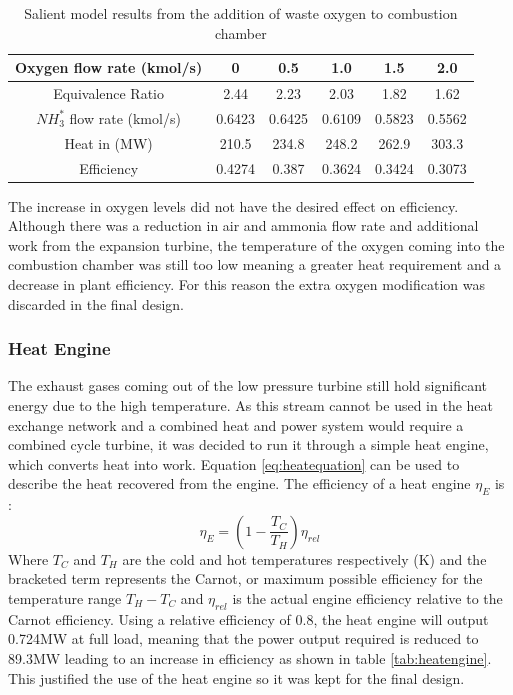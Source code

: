 \begin {table} [h]
\begin{center}
\caption{Salient model results from the addition of waste oxygen to combustion chamber} \label{tab:extraox} 
\begin{tabular}{ |c|c|c|c|c|c| }
 \hline
  Oxygen flow rate (kmol/s) & 0 & 0.5 & 1.0 & 1.5 & 2.0\\ 
   \hline
  Equivalence Ratio & 2.44 & 2.23 & 2.03 & 1.82 & 1.62\\
    \hline
  $NH_3^*$ flow rate (kmol/s) & 0.6423 & 0.6425 & 0.6109 & 0.5823 & 0.5562\\ 
    \hline
  Heat in (MW) & 210.5 & 234.8 & 248.2 & 262.9 & 303.3 \\
  \hline
  Efficiency & 0.4274 & 0.387 & 0.3624 & 0.3424 & 0.3073\\ 
 \hline
\end{tabular}
\end{center}  
\end {table} 
The increase in oxygen levels did not have the desired effect on efficiency. Although there was a reduction in air and ammonia flow rate and additional work from the expansion turbine, the temperature of the oxygen coming into the combustion chamber was still too low meaning a greater heat requirement and a decrease in plant efficiency. For this reason the extra oxygen modification was discarded in the final design.


\subsubsection{Heat Engine}
The exhaust gases coming out of the low pressure turbine still hold significant energy due to the high temperature. As this stream cannot be used in the heat exchange network and a combined heat and power system would require a combined cycle turbine, it was decided to run it through a simple heat engine, which converts heat into work. Equation \ref{eq:heatequation} can be used to describe the heat recovered from the engine. The efficiency of a heat engine $\eta_E$ is \cite{thermonotes}:
\begin{equation}
\eta_E = (1 - \frac{T_C}{T_H}) \eta_{rel} 
\end{equation}
Where $T_C$ and $T_H$ are the cold and hot temperatures respectively (K) and the bracketed term represents the Carnot, or maximum possible efficiency for the temperature range $T_H - T_C$ and $\eta_{rel}$ is the actual engine efficiency relative to the Carnot efficiency. Using a relative efficiency of 0.8, the heat engine will output 0.724MW at full load, meaning that the power output required is reduced to 89.3MW leading to an increase in efficiency as shown in table \ref{tab:heatengine}. This justified the use of the heat engine so it was kept for the final design.

